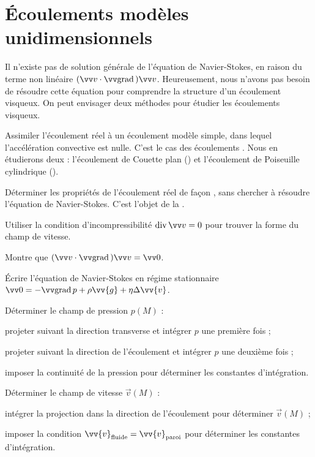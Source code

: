 \documentclass[12pt,fancy]{cours}
\begin{document}

\section{Écoulements modèles unidimensionnels}
Il n'existe pas de solution générale de l'équation de Navier-Stokes, en raison  du terme non linéaire $(\Vec{v}\ps\grad)\Vec{v}$. Heureusement, nous n’avons pas besoin de résoudre cette équation pour comprendre la structure d’un écoulement visqueux. On peut envisager deux méthodes pour étudier les écoulements visqueux.
\begin{liste}
	\item Assimiler l'écoulement réel à un écoulement modèle simple, dans lequel l'accélération convective est nulle. C'est le cas des écoulements . Nous en étudierons deux : l'écoulement de Couette plan () et l'écoulement de Poiseuille cylindrique ().
	\item Déterminer les propriétés de l'écoulement réel de façon , sans chercher à résoudre l'équation de Navier-Stokes.  C'est l'objet de la .
\end{liste}


\begin{methode}
\item Utiliser la condition d'incompressibilité $\dive \Vec{v} = 0$ pour trouver la forme du champ de vitesse.
\item Montre que $(\Vec{v}\ps\grad)\Vec{v} = \Vec{0}$.
\item Écrire l'équation de Navier-Stokes en régime stationnaire  $\Vec{0} = -\grad{p}+\rho\vv{g}+\eta\Delta\vv{v} $.
\item Déterminer le champ de pression $p(M)$ :
\begin{liste}
	\item projeter suivant la direction transverse et intégrer $p$ une première fois ;
	\item projeter suivant la direction de l'écoulement et intégrer $p$ une deuxième fois ;
	\item imposer la continuité de la pression pour déterminer les constantes d'intégration.
\end{liste}
\item Déterminer le champ de vitesse $\Vec{v}(M)$ :
\begin{liste}
	\item intégrer la projection dans la direction de l'écoulement pour déterminer $\Vec{v}(M)$ ;
	\item imposer la condition $\vv{v}_{\rm{fluide}}=\vv{v}_{\rm{paroi}}$ pour déterminer les constantes d'intégration.
\end{liste}
\end{methode}
\end{document}
